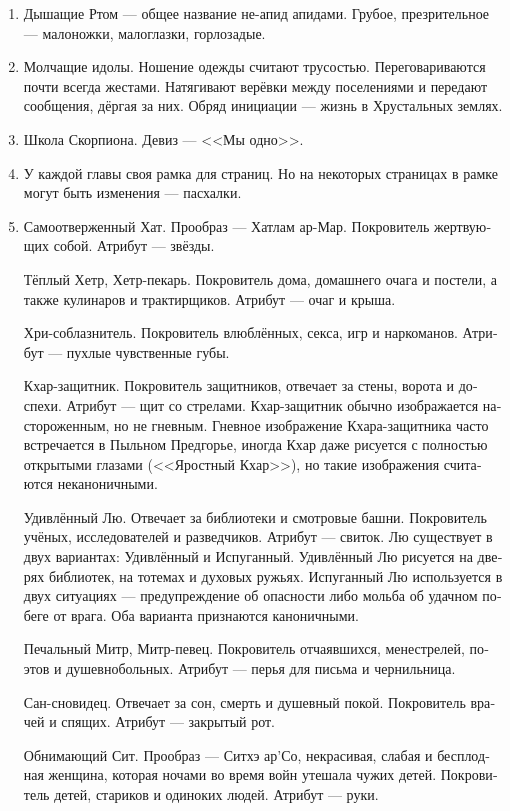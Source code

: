 \documentclass[a4paper,12pt,fleqn]{book}\usepackage{polyglossia}\setdefaultlanguage[babelshorthands=true]{russian}\setotherlanguage{english}\defaultfontfeatures{Ligatures=TeX,Mapping=tex-text}\usepackage{xcolor}\newcommand{\ml}[3]{#2}
\begin{document}
{\begin{enumerate}
\item Дышащие Ртом --- общее название не-апид апидами.
Грубое, презрительное --- малоножки, малоглазки, горлозадые.

\item Молчащие идолы.
Ношение одежды считают трусостью.
Переговариваются почти всегда жестами.
Натягивают верёвки между поселениями и передают сообщения, дёргая за них.
Обряд инициации --- жизнь в Хрустальных землях.

\item Школа Скорпиона.
Девиз --- <<Мы одно>>.

\item У каждой главы своя рамка для страниц.
Но на некоторых страницах в рамке могут быть изменения --- пасхалки.

\item Самоотверженный Хат.
Прообраз --- Хатлам ар-Мар.
Покровитель жертвующих собой.
Атрибут --- звёзды.

Тёплый Хетр, Хетр-пекарь.
Покровитель дома, домашнего очага и постели, а также кулинаров и трактирщиков.
Атрибут --- очаг и крыша.

Хри-соблазнитель.
Покровитель влюблённых, секса, игр и наркоманов.
Атрибут --- пухлые чувственные губы.

Кхар-защитник.
Покровитель защитников, отвечает за стены, ворота и доспехи.
Атрибут --- щит со стрелами.
Кхар-защитник обычно изображается настороженным, но не гневным.
Гневное изображение Кхара-защитника часто встречается в Пыльном Предгорье, иногда Кхар даже рисуется с полностью открытыми глазами (<<Яростный Кхар>>), но такие изображения считаются неканоничными.

Удивлённый Лю.
Отвечает за библиотеки и смотровые башни.
Покровитель учёных, исследователей и разведчиков.
Атрибут --- свиток.
Лю существует в двух вариантах: Удивлённый и Испуганный.
Удивлённый Лю рисуется на дверях библиотек, на тотемах и духовых ружьях.
Испуганный Лю используется в двух ситуациях --- предупреждение об опасности либо мольба об удачном побеге от врага.
Оба варианта признаются каноничными.

Печальный Митр, Митр-певец.
Покровитель отчаявшихся, менестрелей, поэтов и душевнобольных.
Атрибут --- перья для письма и чернильница.

Сан-сновидец.
Отвечает за сон, смерть и душевный покой.
Покровитель врачей и спящих.
Атрибут --- закрытый рот.

Обнимающий Сит.
Прообраз --- Ситхэ ар'Со, некрасивая, слабая и бесплодная женщина, которая ночами во время войн утешала чужих детей.
Покровитель детей, стариков и одиноких людей.
Атрибут --- руки.


\end{enumerate}}
\end{document}
